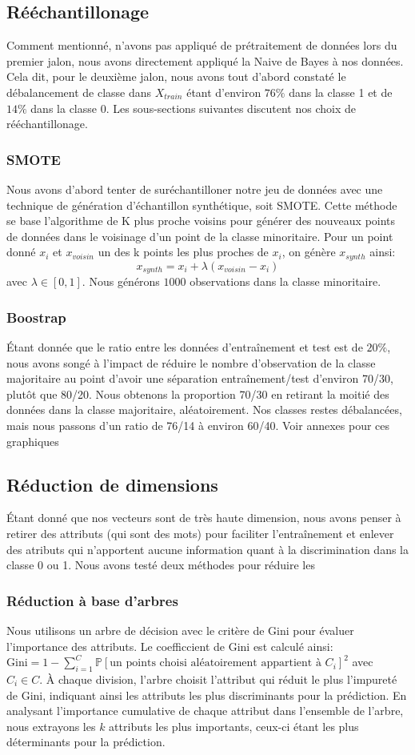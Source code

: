 \documentclass{article}
\begin{document}
\subsection{Rééchantillonage}
Comment mentionné, n'avons pas appliqué de prétraitement de données lors du premier jalon, nous avons directement appliqué la Naive de Bayes à nos données. Cela dit, pour le deuxième jalon, nous avons tout d'abord constaté le débalancement de classe dans $X_{train}$ étant d'environ $76\%$ dans la classe 1 et de $14\%$ dans la classe 0. Les sous-sections suivantes discutent nos choix de rééchantillonage.
\subsubsection{SMOTE}
Nous avons d'abord tenter de suréchantilloner notre jeu de données avec une technique de génération d'échantillon synthétique, soit SMOTE. Cette méthode se base l'algorithme de K plus proche voisins pour générer des nouveaux points de données dans le voisinage d'un point de la classe minoritaire. Pour un point donné $x_i$ et $x_{voisin}$ un des k points les plus proches de $x_i$, on génère $x_{synth}$ ainsi:\\
$$x_{synth} = x_i + \lambda (x_{voisin} - x_i)$$ avec $\lambda \in [0, 1]$.
Nous générons $1000$ observations dans la classe minoritaire.
\subsubsection{Boostrap}
Étant donnée que le ratio entre les données d'entraînement et test est de $20\%$, nous avons songé à l'impact de réduire le nombre d'observation de la classe majoritaire au point d'avoir une séparation entraînement/test d'environ 70/30, plutôt que 80/20. Nous obtenons la proportion 70/30 en retirant la moitié des données dans la classe majoritaire, aléatoirement. Nos classes restes débalancées, mais nous passons d'un ratio de 76/14 à environ 60/40. Voir annexes pour ces graphiques
\subsection{Réduction de dimensions}
Étant donné que nos vecteurs sont de très haute dimension, nous avons penser à retirer des attributs (qui sont des mots) pour faciliter l'entraînement et enlever des atributs qui n'apportent aucune information quant à la discrimination dans la classe 0 ou 1. Nous avons testé deux méthodes pour réduire les 
\subsubsection{Réduction à base d'arbres}
Nous utilisons un arbre de décision avec le critère de Gini pour évaluer l'importance des attributs. Le coefficcient de Gini est calculé ainsi: $\text{Gini} = 1 - \sum_{i=1}^{C} \mathbb{P}[\text{un points choisi aléatoirement appartient à $C_i$}]^2$ avec $C_i \in C$. À chaque division, l’arbre choisit l’attribut qui réduit le plus l'impureté de Gini, indiquant ainsi les attributs les plus discriminants pour la prédiction. En analysant l'importance cumulative de chaque attribut dans l'ensemble de l'arbre, nous extrayons les $k$ attributs les plus importants, ceux-ci étant les plus déterminants pour la prédiction.
\end{document}
